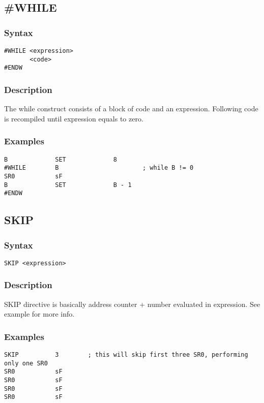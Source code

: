     \subsection{\#WHILE}
        \subsubsection{Syntax}
            \verb'#WHILE <expression>'\\
            \verb'       <code>'\\
            \verb'#ENDW'

        \subsubsection{Description}
            The while construct consists of a block of code and an expression. Following code is recompiled until expression equals to zero.

        \subsubsection{Examples}
            \verb'B             SET             8'\\
            \verb'#WHILE        B                       ; while B != 0'\\
            \verb'SR0           sF'\\
            \verb'B             SET             B - 1'\\
            \verb'#ENDW'

    \subsection{SKIP}
        \subsubsection{Syntax}
            \verb'SKIP <expression>'

        \subsubsection{Description}
            SKIP directive is basically address counter + number evaluated in expression. See example for more info.

        \subsubsection{Examples}
            \verb'SKIP          3        ; this will skip first three SR0, performing only one SR0'\\
            \verb'SR0           sF'\\
            \verb'SR0           sF'\\
            \verb'SR0           sF'\\
            \verb'SR0           sF'

